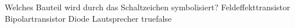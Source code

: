     {Welches Bauteil wird durch das Schaltzeichen symbolisiert?}
    {Feldeffekttransistor}
    {Bipolartransistor}
    {Diode}
    {Lautsprecher}
    {true}{false}